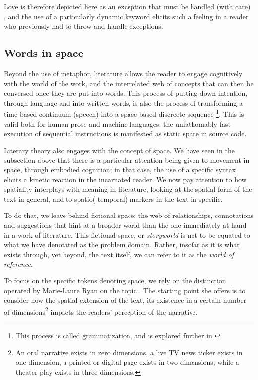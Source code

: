 Love is therefore depicted here as an exception that must be handled (with care) , and the use of a particularly dynamic keyword elicits such a feeling in a reader who previously had to throw and handle exceptions.

\subsection{Words in space}
\label{subsec:spatial-literature}

Beyond the use of metaphor, literature allows the reader to engage cognitively with the world of the work, and the interrelated web of concepts that can then be conversed once they are put into words. This process of putting down intention, through language and into written words, is also the process of transforming a time-based continuum (speech) into a space-based discreete sequence \footnote{This process is called grammatization, and is explored further in \citep{bouchardon_valeur_2014}}. This is valid both for human prose and machine languages: the unfathomably fast execution of sequential instructions is manifested as static space in source code.

Literary theory  also engages with the concept of space. We have seen in the subsection above that there is a particular attention being given to movement in space, through embodied cognition; in that case, the use of a specific syntax elicits a kinetic reaction in the incarnated reader. We now pay attention to how spatiality interplays with meaning in literature, looking at the spatial form of the text in general, and to spatio(-temporal) markers in the text in specific.

To do that, we leave behind fictional space: the web of relationships, connotations and suggestions that hint at a broader world than the one immediately at hand in a work of literature. This fictional space, or \emph{storyworld} is not to be equated to what we have denotated as the problem domain. Rather, insofar as it is what exists through, yet beyond, the text itself, we can refer to it as the \emph{world of reference}.

To focus on the specific tokens denoting space, we rely on the distinction operated by Marie-Laure Ryan on the topic \citep{ryan_space_2009}. The starting point she offers is to consider how the spatial extension of the text, its existence in a certain number of dimensions\footnote{An oral narrative exists in zero dimensions, a live TV news ticker exists in one dimension, a printed or digital page exists in two dimensions, while a theater play exists in three dimensions.} impacts the readers' perception of the narrative.

